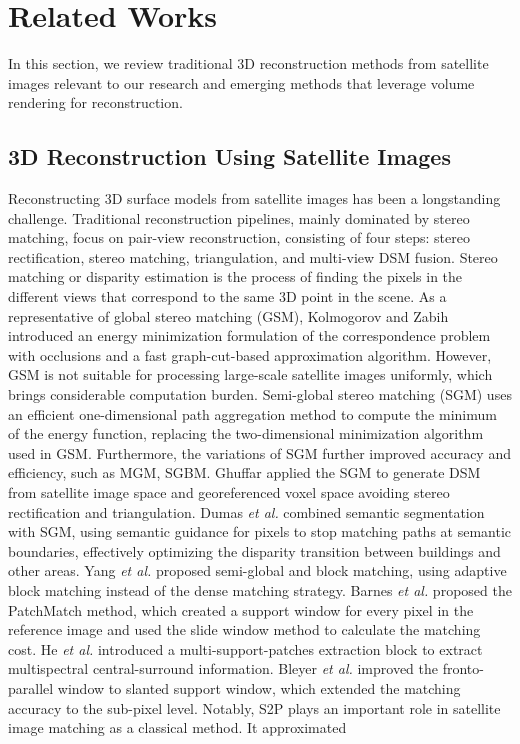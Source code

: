 \section{Related Works}
\label{related_works}
In this section, we review traditional 3D reconstruction methods from satellite images relevant to our research and emerging methods that leverage volume rendering for reconstruction.

\subsection{3D Reconstruction Using Satellite Images}
Reconstructing 3D surface models from satellite images has been a longstanding challenge\cite{duan2016towards,facciolo2017automatic,zhao2021double,stucker2022resdepth,gao2023general}. Traditional reconstruction pipelines, mainly dominated by stereo matching, focus on pair-view reconstruction, consisting of four steps: stereo rectification, stereo matching, triangulation, and multi-view DSM fusion\cite{zhao2023review}. Stereo matching or disparity estimation is the process of finding the pixels in the different views that correspond to the same 3D point in the scene\cite{OROZCO2016121}. As a representative of global stereo matching (GSM), Kolmogorov and Zabih\cite{kolmogorov2001computing} introduced an energy minimization formulation of the correspondence problem with occlusions and a fast graph-cut-based approximation algorithm. However, GSM is not suitable for processing large-scale satellite images uniformly, which brings considerable computation burden. Semi-global stereo matching (SGM)\cite{hirschmuller2005accurate,hirschmuller2007stereo} uses an efficient one-dimensional path aggregation method to compute the minimum of the energy function, replacing the two-dimensional minimization algorithm used in GSM. Furthermore, the variations of SGM further improved accuracy and efficiency, such as MGM\cite{Facciolo2015MGMAS}, SGBM\cite{lastilla2019}. Ghuffar\cite{ghuffar2016satellite} applied the SGM to generate DSM from satellite image space and georeferenced voxel space avoiding stereo rectification and triangulation. Dumas \textit{et al.}\cite{dumas2022improving} combined semantic segmentation with SGM, using semantic guidance for pixels to stop matching paths at semantic boundaries, effectively optimizing the disparity transition between buildings and other areas. Yang \textit{et al.}\cite{yang2020novel} proposed semi-global and block matching, using adaptive block matching instead of the dense matching strategy. Barnes \textit{et al.}\cite{barnes2009patchmatch} proposed the PatchMatch method, which created a support window for every pixel in the reference image and used the slide window method to calculate the matching cost. He \textit{et al.}\cite{he2019learing} introduced a multi-support-patches extraction block to extract multispectral central-surround information. Bleyer \textit{et al.}\cite{bleyer2011patchmatch} improved the fronto-parallel window to slanted support window, which extended the matching accuracy to the sub-pixel level. Notably, S2P\cite{franchis2014pipeline,franchis2014refine,franchis2014rect} plays an important role in satellite image matching as a classical method. It approximated 